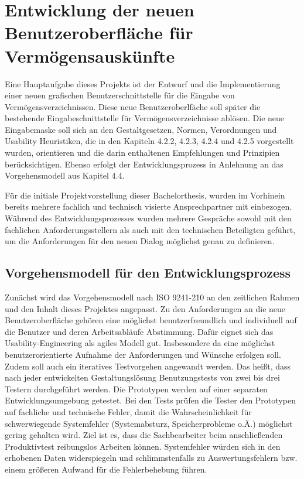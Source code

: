 \section{Entwicklung der neuen Benutzeroberfläche für Vermögensauskünfte}
Eine Hauptaufgabe dieses Projekts ist der Entwurf und die Implementierung einer neuen grafischen Benutzerschnittstelle für die Eingabe von Vermögensverzeichnissen. Diese neue Benutzeroberlfäche soll später die bestehende Eingabeschnittstelle für Vermögensverzeichnisse ablösen. Die neue Eingabemaske soll sich an den Gestaltgesetzen, Normen, Verordnungen und Usability Heuristiken, die in den Kapiteln 4.2.2, 4.2.3, 4.2.4 und 4.2.5 vorgestellt wurden, orientieren und die darin enthaltenen Empfehlungen und Prinzipien berücksichtigen. Ebenso erfolgt der Entwicklungsprozess in Anlehnung an das Vorgehensmodell aus Kapitel 4.4. 

Für die initiale Projektvorstellung dieser Bachelorthesis, wurden im Vorhinein bereits mehrere fachlich und technisch visierte Ansprechpartner mit einbezogen. Während des Entwicklungsprozesses wurden mehrere Gespräche sowohl mit den fachlichen Anforderungsstellern als auch mit den technischen Beteiligten geführt, um die Anforderungen für den neuen Dialog möglichst genau zu definieren.


\subsection{Vorgehensmodell für den Entwicklungsprozess}

Zunächst wird das Vorgehensmodell nach ISO 9241-210 an den zeitlichen Rahmen und den Inhalt dieses Projektes angepasst. Zu den Anforderungen an die neue Benutzeroberfläche gehören eine möglichst benutzerfreundlich und individuell auf die Benutzer und deren Arbeitsabläufe Abstimmung. Dafür eignet sich das Usability-Engineering als agiles Modell gut. Insbesondere da eine möglichst benutzerorientierte Aufnahme der Anforderungen und Wünsche erfolgen soll. Zudem soll auch ein iteratives Testvorgehen angewandt werden. Das heißt, dass nach jeder entwickelten Gestaltungslösung Benutzungstests von zwei bis drei Testern durchgeführt werden. Die Prototypen werden auf einer separaten Entwicklungsumgebung getestet. Bei den Tests prüfen die Tester den Prototypen auf fachliche und technische Fehler, damit die Wahrscheinlichkeit für schwerwiegende Systemfehler (Systemabsturz, Speicherprobleme o.Ä.) möglichst gering gehalten wird. Ziel ist es, dass die Sachbearbeiter beim anschließenden Produktivtest reibungslos Arbeiten können. Systemfehler würden sich in den erhobenen Daten widerspiegeln und schlimmstenfalls zu Auswertungsfehlern bzw. einem größeren Aufwand für die Fehlerbehebung führen.

